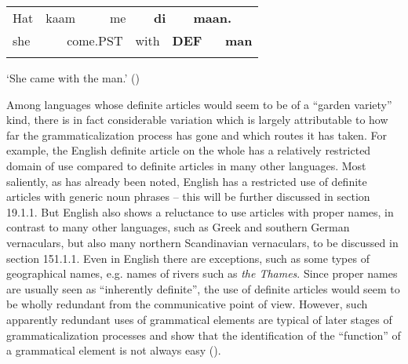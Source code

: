 \begin{tabular}{llllllllll}
\lsptoprule
Hat & \multicolumn{2}{l}{kaam

} & \multicolumn{2}{l}{me

} & \multicolumn{2}{l}{{\bfseries di}

} & \multicolumn{2}{l}{{\bfseries maan.}

} & \\
\multicolumn{2}{l}{she

} & \multicolumn{2}{l}{come.PST

} & \multicolumn{2}{l}{with

} & \multicolumn{2}{l}{{\bfseries DEF}

} & \multicolumn{2}{l}{{\bfseries man}

}\\
\lspbottomrule
\end{tabular}

\begin{styleTranslation}
 ‘She came with the man.’ (\citet[163]{Lyons1999})

\end{styleTranslation}

\begin{styleBodyTextFirst}
Among languages whose definite articles would seem to be of a “garden variety” kind, there is in fact considerable variation which is largely attributable to how far the grammaticalization process has gone and which routes it has taken. For example, the English definite article on the whole has a relatively restricted domain of use compared to definite articles in many other languages. Most saliently, as has already been noted, English has a restricted use of definite articles with generic noun phrases – this will be further discussed in section 19.1.1. But English also shows a reluctance to use articles with proper names, in contrast to many other languages, such as Greek and southern German vernaculars, but also many northern Scandinavian vernaculars, to be discussed in section 151.1.1. Even in English there are exceptions, such as some types of geographical names, e.g. names of rivers such as \textit{the Thames}. Since proper names are usually seen as “inherently definite”, the use of definite articles would seem to be wholly redundant from the communicative point of view. However, such apparently redundant uses of grammatical elements are typical of later stages of grammaticalization processes and show that the identification of the “function” of a grammatical element is not always easy (\citet[81-86]{Dahl2004}).

\end{styleBodyTextFirst}

